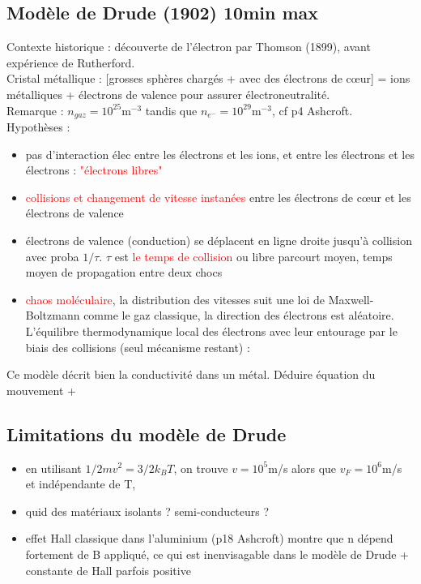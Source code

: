 \subsection{Modèle de Drude (1902) 10min max}
Contexte historique : découverte de l'électron par Thomson (1899), avant expérience de Rutherford.\\
Cristal métallique : [grosses sphères chargés + avec des électrons de c\oe ur] = ions métalliques  + électrons de valence pour assurer électroneutralité.\\
Remarque : $n_{gaz}=10^{25}$m$^{-3}$ tandis que $n_{e^{-}}=10^{29}$m$^{-3}$, cf p4 Ashcroft.\\
Hypothèses :\begin{itemize}
    \item pas d'interaction élec entre les électrons et les ions, et entre les électrons et les électrons : \textcolor{red}{"électrons libres"}
    \item \textcolor{red}{collisions et changement de vitesse instanées} entre les électrons de c\oe ur et les électrons de valence
    \item électrons de valence (conduction) se déplacent en ligne droite jusqu'à collision avec proba $1/\tau$. $\tau$ est \textcolor{red}{le temps de collision} ou libre parcourt moyen, temps moyen de propagation entre deux chocs
    \item \textcolor{red}{chaos moléculaire}, la distribution des vitesses suit une loi de Maxwell-Boltzmann comme le gaz classique, la direction des électrons est aléatoire. L'équilibre thermodynamique local des électrons avec leur entourage par le biais des collisions (seul mécanisme restant) : 
\end{itemize}

Ce modèle décrit bien la conductivité dans un métal.
Déduire équation du mouvement + 
\subsection{Limitations du modèle de Drude}
\begin{itemize}
    \item en utilisant $1/2mv^2=3/2k_BT$, on trouve $v=10^5$m/s alors que $v_{F}=10^6$m/s et indépendante de T,
    \item quid des matériaux isolants ? semi-conducteurs ?
    \item effet Hall classique dans l'aluminium (p18 Ashcroft) montre que n dépend fortement de B appliqué, ce qui est inenvisagable dans le modèle de Drude + constante de Hall parfois positive
\end{itemize}

